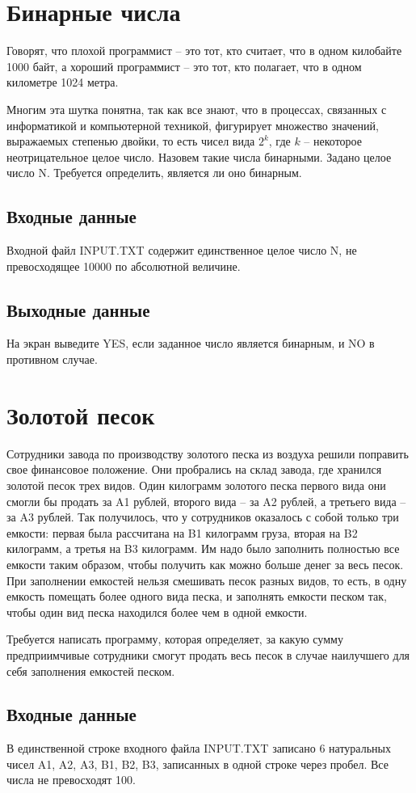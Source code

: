 \documentclass[12pt]{article}
\begin{document}
\section{Бинарные числа}
Говорят, что плохой программист – это тот, кто считает, что в одном килобайте 1000 байт, а хороший программист – это тот, кто полагает, что в одном километре 1024 метра.

Многим эта шутка понятна, так как все знают, что в процессах, связанных с информатикой и компьютерной техникой, фигурирует множество значений, выражаемых степенью двойки, то есть чисел вида $2^k$, где $k$ – некоторое неотрицательное целое число. Назовем такие числа бинарными. 
Задано целое число N. Требуется определить, является ли оно бинарным.
\subsection{Входные данные}
Входной файл INPUT.TXT содержит единственное целое число N, не превосходящее 10000 по абсолютной величине.
\subsection{Выходные данные}
На экран выведите YES, если заданное число является бинарным, и NO в противном случае.

\section{Золотой песок}
Сотрудники завода по производству золотого песка из воздуха решили поправить свое финансовое положение. Они пробрались на склад завода, где хранился золотой песок трех видов. Один килограмм золотого песка первого вида они смогли бы продать за A1 рублей, второго вида – за A2 рублей, а третьего вида – за A3 рублей. Так получилось, что у сотрудников оказалось с собой только три емкости: первая была рассчитана на B1 килограмм груза, вторая на B2 килограмм, а третья на B3 килограмм. Им надо было заполнить полностью все емкости таким образом, чтобы получить как можно больше денег за весь песок. При заполнении емкостей нельзя смешивать песок разных видов, то есть, в одну емкость помещать более одного вида песка, и заполнять емкости песком так, чтобы один вид песка находился более чем в одной емкости.

Требуется написать программу, которая определяет, за какую сумму предприимчивые сотрудники смогут продать весь песок в случае наилучшего для себя заполнения емкостей песком.
\subsection{Входные данные}
В единственной строке входного файла INPUT.TXT записано 6 натуральных чисел A1, A2, A3, B1, B2, B3, записанных в одной строке через пробел. Все числа не превосходят 100.
\end{document}
